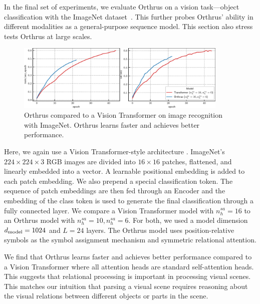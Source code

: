 In the final set of experiments, we evaluate Orthrus on a vision task---object classification with the ImageNet dataset~\citep{imagenet}. This further probes Orthrus' ability in different modalities as a general-purpose sequence model. This section also stress tests Orthrus at large scales.

\begin{figure}[ht]
    \centering
    \includegraphics[width=0.9\textwidth]{figs/experiments/imagenet/imagenet_acc_curves.pdf}
    \caption{Orthrus compared to a Vision Transformer on image recognition with ImageNet. Orthrus learns faster and achieves better performance.}
\end{figure}


Here, we again use a Vision Transformer-style architecture \citep{dosovitskiyImageWorth16x162020}. ImageNet's $224 \times 224 \times 3$ RGB images are divided into $16 \times 16$ patches, flattened, and linearly embedded into a vector. A learnable positional embedding is added to each patch embedding. We also prepend a special classification token. The sequence of patch embeddings are then fed through an Encoder and the embedding of the class token is used to generate the final classification through a fully connected layer. We compare a Vision Transformer model with $n_h^{sa} = 16$ to an Orthrus model with $n_h^{sa} = 10, n_h^{sa} = 6$. For both, we used a model dimension $d_{\mathrm{model}} = 1024$ and $L = 24$ layers. The Orthrus model uses position-relative symbols as the symbol assignment mechanism and symmetric relational attention.

We find that Orthrus learns faster and achieves better performance compared to a Vision Transformer where all attention heads are standard self-attention heads. This suggests that relational processing is important in processing visual scenes. This matches our intuition that parsing a visual scene requires reasoning about the visual relations between different objects or parts in the scene.